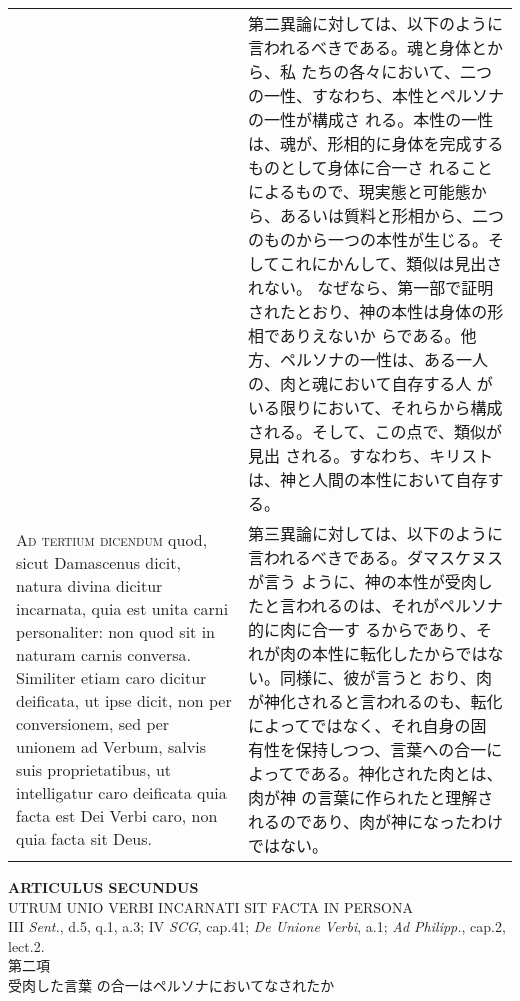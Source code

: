 \documentclass[10pt]{jsarticle} %
\begin{document}
\begin{longtable}{p{21em}p{21em}}
&

第二異論に対しては、以下のように言われるべきである。魂と身体とから、私
たちの各々において、二つの一性、すなわち、本性とペルソナの一性が構成さ
れる。本性の一性は、魂が、形相的に身体を完成するものとして身体に合一さ
れることによるもので、現実態と可能態から、あるいは質料と形相から、二つ
のものから一つの本性が生じる。そしてこれにかんして、類似は見出されない。
なぜなら、第一部で証明されたとおり、神の本性は身体の形相でありえないか
らである。他方、ペルソナの一性は、ある一人の、肉と魂において自存する人
がいる限りにおいて、それらから構成される。そして、この点で、類似が見出
される。すなわち、キリストは、神と人間の本性において自存する。




\\



{\scshape Ad tertium dicendum} quod, sicut Damascenus dicit, natura
divina dicitur incarnata, quia est unita carni personaliter: non quod
sit in naturam carnis conversa. Similiter etiam caro dicitur
deificata, ut ipse dicit, non per conversionem, sed per unionem ad
Verbum, salvis suis proprietatibus, ut intelligatur caro deificata
quia facta est Dei Verbi caro, non quia facta sit Deus.


&


第三異論に対しては、以下のように言われるべきである。ダマスケヌスが言う
ように、神の本性が受肉したと言われるのは、それがペルソナ的に肉に合一す
るからであり、それが肉の本性に転化したからではない。同様に、彼が言うと
おり、肉が神化されると言われるのも、転化によってではなく、それ自身の固
有性を保持しつつ、言葉への合一によってである。神化された肉とは、肉が神
の言葉に作られたと理解されるのであり、肉が神になったわけではない。



\end{longtable}
\newpage






\begin{center}
{\Large {\bf ARTICULUS SECUNDUS}}\\ {\large UTRUM UNIO VERBI INCARNATI
SIT FACTA IN PERSONA}\\ {\footnotesize III {\itshape Sent.}, d.5, q.1,
a.3; IV {\itshape SCG}, cap.41; {\itshape De Unione Verbi}, a.1;
{\itshape Ad Philipp.}, cap.2, lect.2.}\\ {\Large 第二項\\受肉した言葉
の合一はペルソナにおいてなされたか}
\end{center}
\end{document}
